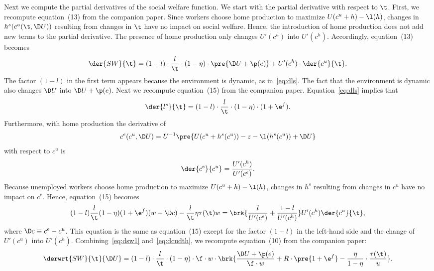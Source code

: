 \documentclass[letterpaper,12pt,leqno]{article}
\begin{document}
Next we compute the partial derivatives of the social welfare function. We start with the partial derivative with respect to $\t$. First, we recompute equation~(13) from the companion paper. Since workers choose home production to maximize $U(c^{u}+h)-\l(h)$, changes in $h^{s}(c^{u}(\t,\D U))$ resulting from changes in $\t$ have no impact on social welfare. Hence, the introduction of home production does not add new terms to the partial derivative. The presence of home production only changes $U'(c^{u})$ into $U'(c^{h})$. Accordingly, equation~(13) becomes
\begin{equation}
\der{SW}{\t}=(1-l)\cdot \frac{l}{\t}\cdot (1-\eta) \cdot  \pre{\D U + \p(e)}+ U'(c^{h})\cdot \der{c^{u}}{\t}.\label{eq:dsw1}
\end{equation}
The factor $(1-l)$ in the first term appears because the environment is dynamic, as in~\eqref{eq:dls}. The fact that the environment is dynamic also changes $\D U$ into $\D U + \p(e)$. Next we recompute equation~(15) from the companion paper. Equation~\eqref{eq:dls} implies that 
\begin{equation*}
\der{l^{s}}{\t}=(1-l) \cdot \frac{l}{\t}\cdot (1-\eta) \cdot (1+\e^{f}). 
\end{equation*}
Furthermore, with home production the derivative of 
\begin{equation*}
c^{e}(c^{u},\D U)=U^{-1}\pre{U(c^{u}+h^{s}(c^{u}))-z-\l(h^{s}(c^{u}))+\D U}
\end{equation*}
with respect to $c^{u}$ is 
\begin{equation*}
\der{c^{e}}{c^{u}}=\frac{U'(c^{h})}{U'(c^{e})}.
\end{equation*}
Because unemployed workers choose home production to maximize $U(c^{u}+h)-\l(h)$, changes in $h^{s}$ resulting from changes in $c^{u}$ have no impact on $c^{e}$. Hence, equation~(15) becomes
\begin{equation}
(1-l) \frac{l}{\t} (1-\eta) (1+\e^{f})  (w-\D c)- \frac{l}{\t} \eta \tau(\t) w =\brk{\frac{l}{U'(c^{e})}+\frac{1-l}{U'(c^{h})}} U'(c^{h}) \der{c^{u}}{\t},
\label{eq:dcudth}\end{equation}
where $\D c \equiv c^{e}-c^{u}$. This equation is the same as equation~(15) except for the factor $(1-l)$ in the left-hand side and the change of $U'(c^{u})$ into $U'(c^{h})$. Combining~\eqref{eq:dsw1} and~\eqref{eq:dcudth}, we recompute equation~(10) from the companion paper:
\begin{equation}
\derwrt{SW}{\t}{\D U} =  (1-l)\cdot \frac{l}{\t}\cdot (1-\eta)\cdot\f\cdot w\cdot \brk{\frac{\D U+\p(e)}{\f\cdot w}+R\cdot \pre{1+\e^{f}}- \frac{\eta}{1-\eta}\cdot  \frac{\tau(\t)}{u}}.
\label{eq:swth}\end{equation}
\end{document}
